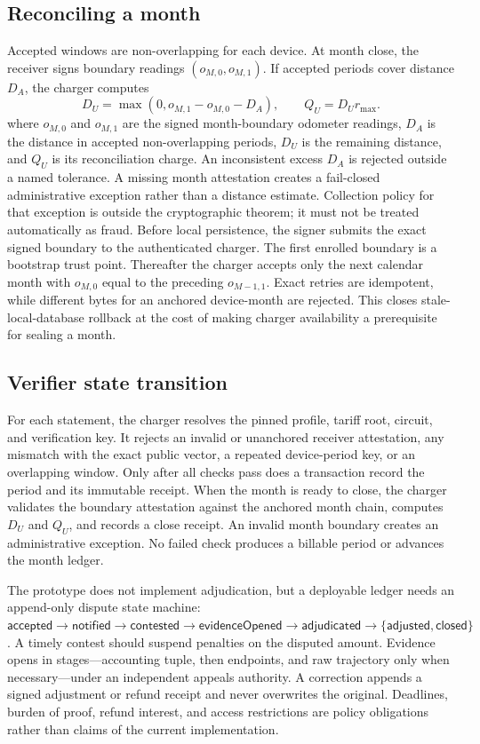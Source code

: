 \documentclass[conference]{IEEEtran}
\theoremstyle{plain}
\theoremstyle{definition}
\newcommand{\rmax}{r_{\max}}
\begin{document}
\subsection{Reconciling a month}

Accepted windows are non-overlapping for each device. At month close, the
receiver signs boundary readings $(o_{M,0},o_{M,1})$. If accepted periods cover
distance $D_A$, the charger computes
\[
 D_U=\max(0,o_{M,1}-o_{M,0}-D_A),\qquad Q_U=D_U\rmax.
\]
where $o_{M,0}$ and $o_{M,1}$ are the signed month-boundary odometer
readings, $D_A$ is the distance in accepted non-overlapping periods, $D_U$ is
the remaining distance, and $Q_U$ is its reconciliation charge.
An inconsistent excess $D_A$ is rejected outside a named tolerance. A missing
month attestation creates a fail-closed administrative exception rather than a
distance estimate. Collection policy for that exception is outside the
cryptographic theorem; it must not be treated automatically as fraud. Before
local persistence, the signer submits the exact
signed boundary to the authenticated charger. The first enrolled boundary is a
bootstrap trust point. Thereafter the charger accepts only the next calendar
month with $o_{M,0}$ equal to the preceding $o_{M-1,1}$. Exact retries are
idempotent, while different bytes for an anchored device-month are rejected.
This closes stale-local-database rollback at the cost of making charger
availability a prerequisite for sealing a month.

\subsection{Verifier state transition}

For each statement, the charger resolves the pinned profile, tariff root,
circuit, and verification key. It rejects an invalid or unanchored receiver
attestation, any mismatch with the exact public vector, a repeated
device-period key, or an overlapping window. Only after all checks pass does a
transaction record the period and its immutable receipt. When the month is
ready to close, the charger validates the boundary attestation against the
anchored month chain, computes $D_U$ and $Q_U$, and records a close receipt. An
invalid month boundary creates an administrative exception. No failed check
produces a billable period or advances the month ledger.

The prototype does not implement adjudication, but a deployable ledger needs an
append-only dispute state machine:
$\mathsf{accepted}\rightarrow\mathsf{notified}\rightarrow\mathsf{contested}
\rightarrow\mathsf{evidenceOpened}\rightarrow\mathsf{adjudicated}
\rightarrow\{\mathsf{adjusted},\mathsf{closed}\}$. A timely contest should
suspend penalties on the disputed amount. Evidence opens in stages---accounting
tuple, then endpoints, and raw trajectory only when necessary---under an
independent appeals authority. A correction appends a signed adjustment or
refund receipt and never overwrites the original. Deadlines, burden of proof,
refund interest, and access restrictions are policy obligations rather than
claims of the current implementation.
\end{document}
